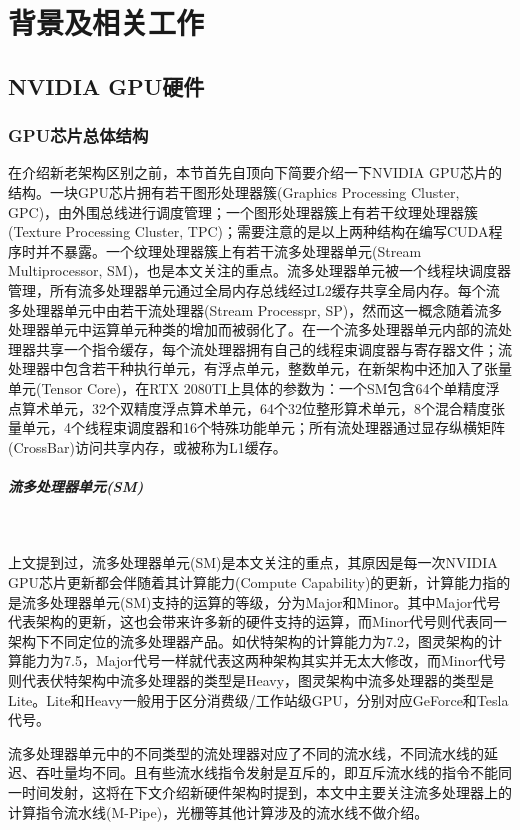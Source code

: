 \newpage
\setcounter{table}{0}
\setcounter{figure}{0}
\section{背景及相关工作}

\subsection{NVIDIA GPU硬件}
\subsubsection{GPU芯片总体结构} 
\par 在介绍新老架构区别之前，本节首先自顶向下简要介绍一下NVIDIA GPU芯片的结构。一块GPU芯片拥有若干图形处理器簇(Graphics Processing Cluster, GPC)，由外围总线进行调度管理；一个图形处理器簇上有若干纹理处理器簇(Texture Processing Cluster, TPC)；需要注意的是以上两种结构在编写CUDA程序时并不暴露。一个纹理处理器簇上有若干流多处理器单元(Stream Multiprocessor, SM)，也是本文关注的重点。流多处理器单元被一个线程块调度器管理，所有流多处理器单元通过全局内存总线经过L2缓存共享全局内存。每个流多处理器单元中由若干流处理器(Stream Processpr, SP)，然而这一概念随着流多处理器单元中运算单元种类的增加而被弱化了。在一个流多处理器单元内部的流处理器共享一个指令缓存，每个流处理器拥有自己的线程束调度器与寄存器文件；流处理器中包含若干种执行单元，有浮点单元，整数单元，在新架构中还加入了张量单元(Tensor Core)，在RTX 2080TI上具体的参数为：一个SM包含64个单精度浮点算术单元，32个双精度浮点算术单元，64个32位整形算术单元，8个混合精度张量单元，4个线程束调度器和16个特殊功能单元；所有流处理器通过显存纵横矩阵(CrossBar)访问共享内存，或被称为L1缓存\cite{EXPLORING}。
\subparagraph{流多处理器单元(SM)}~{}
\par 上文提到过，流多处理器单元(SM)是本文关注的重点，其原因是每一次NVIDIA GPU芯片更新都会伴随着其计算能力(Compute Capability)的更新，计算能力指的是流多处理器单元(SM)支持的运算的等级，分为Major和Minor。其中Major代号代表架构的更新，这也会带来许多新的硬件支持的运算，而Minor代号则代表同一架构下不同定位的流多处理器产品。如伏特架构的计算能力为7.2，图灵架构的计算能力为7.5，Major代号一样就代表这两种架构其实并无太大修改，而Minor代号则代表伏特架构中流多处理器的类型是Heavy，图灵架构中流多处理器的类型是Lite。Lite和Heavy一般用于区分消费级/工作站级GPU，分别对应GeForce和Tesla代号。
\par 流多处理器单元中的不同类型的流处理器对应了不同的流水线，不同流水线的延迟、吞吐量均不同。且有些流水线指令发射是互斥的，即互斥流水线的指令不能同一时间发射，这将在下文介绍新硬件架构时提到，本文中主要关注流多处理器上的计算指令流水线(M-Pipe)，光栅等其他计算涉及的流水线不做介绍。
